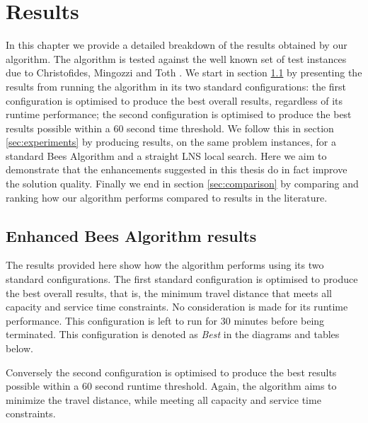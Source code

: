 
\chapter{Results}
\label{chap:results}

In this chapter we provide a detailed breakdown of the results obtained by our algorithm. The algorithm is tested against the well known set of test instances due to Christofides, Mingozzi and Toth \cite{CMT:1981}. We start in section \ref{sec:standardresults} by presenting the results from running the algorithm in its two standard configurations: the first configuration is optimised to produce the best overall results, regardless of its runtime performance; the second configuration is optimised to produce the best results possible within a 60 second time threshold. We follow this in section \ref{sec:experiments} by producing results, on the same problem instances, for a standard Bees Algorithm and a straight LNS local search. Here we aim to demonstrate that the enhancements suggested in this thesis do in fact improve the solution quality. Finally we end in section \ref{sec:comparison} by comparing and ranking how our algorithm performs compared to results in the literature. 

\section{Enhanced Bees Algorithm results}
\label{sec:standardresults}

The results provided here show how the algorithm performs using its two standard configurations. The first standard configuration is optimised to produce the best overall results, that is, the minimum travel distance that meets all capacity and service time constraints. No consideration is made for its runtime performance. This configuration is left to run for 30 minutes before being terminated. This configuration is denoted as \emph{Best} in the diagrams and tables below.

Conversely the second configuration is optimised to produce the best results possible within a 60 second runtime threshold. Again, the algorithm aims to minimize the travel distance, while meeting all capacity and service time constraints.



